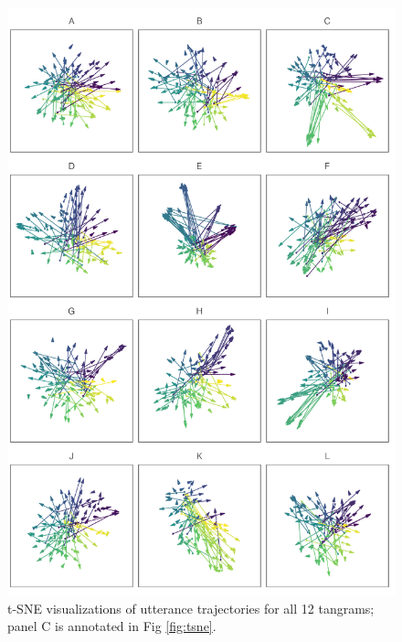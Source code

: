 \documentclass[alpha-refs]{wiley-article}
\begin{document}
\begin{figure}[h]
\centering
\includegraphics[scale=.53]{Sup_Mat_tsne-alltangrams.pdf}
\caption{t-SNE visualizations of utterance trajectories for all 12 tangrams; panel C is annotated in Fig \ref{fig:tsne}. }
\label{fig:all-tsne}
\end{figure}


\end{document}
